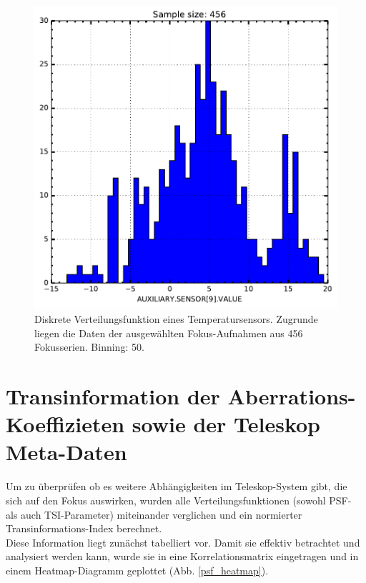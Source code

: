 \begin{figure}[H]
	\centering
	\includegraphics[scale=.75]{tsi_dist/AUXILIARY_SENSOR_9__VALUE.pdf}
	\caption[Diskrete Verteilungsfunktion eines Temperatursensors]{Diskrete Verteilungsfunktion eines Temperatursensors. Zugrunde liegen die Daten der ausgewählten Fokus-Aufnahmen aus 456 Fokusserien. Binning: 50.}
    \label{tsi_temp}
\end{figure}

\section{Transinformation der Aberrations-Koeffizieten sowie der Teleskop Meta-Daten}

Um zu überprüfen ob es weitere Abhängigkeiten im Teleskop-System gibt, die sich auf den Fokus auswirken, wurden alle Verteilungsfunktionen (sowohl PSF- als auch TSI-Parameter) miteinander verglichen und ein normierter Transinformations-Index berechnet.\\
Diese Information liegt zunächst tabelliert vor. Damit sie effektiv betrachtet und analysiert werden kann, wurde sie in eine Korrelationsmatrix eingetragen und in einem Heatmap-Diagramm geplottet (Abb. \ref{psf_heatmap}).

